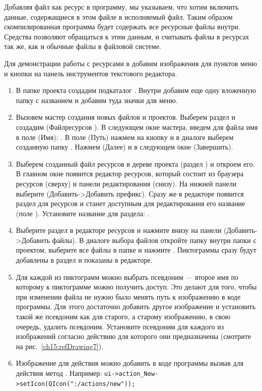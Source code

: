 Добавляя файл как ресурс в программу, мы указываем, что хотим включить данные, содержащиеся в этом файле
в исполняемый файл. Таким образом скомпилированная программа будет содержать все ресурсные файлы внутри. Средства 
позволяют обращаться к этим данным, и считывать файлы в ресурсах так же, как и обычные файлы в файловой системе. 

Для демонстрации работы с ресурсами в  добавим изображения для пунктов меню и кнопки на панель инструментов текстового
редактора. 

\begin{enumerate}
\item В папке проекта создадим подкаталог . Внутри добавим еще одну вложенную папку с названием
 и добавим туда значки для меню. 
\item Вызовем мастер создания новых файлов и проектов. Выберем раздел  и создадим
 (Файлресурсов ). В следующем окне мастера, 
введем для файла имя в поле  (Имя): . В поле  (Путь) нажмем на 
кнопку и в диалоге выберем созданную папку . Нажмем  (Далее) и в 
следующем окне  (Завершить). 
\item Выберем созданный файл ресурсов в дереве проекта (раздел ) и откроем его. В главном
окне  появится редактор ресурсов, который состоит из браузера ресурсов (сверху) и панели редактирования
(снизу). На нижней панели выберите  (Добавить->Добавить префикс). Сразу же
в редакторе появится раздел для ресурсов и станет доступным для редактирования его название (поле
). Установите название для раздела: . 
\item Выберите раздел  в редакторе ресурсов и нажмите внизу на панели 
 (Добавить->Добавить файлы). В диалоге выбора файлов откройте папку  внутри папки с
проектом, выберите все файлы в папке и нажмите . Пиктограммы сразу будут добавлены в раздел и
показаны в редакторе. 
\item Для каждой из пиктограмм можно выбрать псевдоним --- второе имя по которому к пиктограмме 
можно получить доступ. Это
делают для того, чтобы при изменении файла не нужно было менять путь к изображению в коде программы. 
Для этого
достаточно добавить другое изображение и установить такой же псевдоним как для старого, а старому 
изображению, в свою
очередь, удалить псевдоним. Установите псевдоним для каждого из изображений согласно действию для которого они
предназначены (смотрите на рис.~\ref{ch15:refDrawing7}).
\item Изображение для действия можно добавить в коде программы вызвав для действия метод
. Например: \lstinline!ui->action_New->setIcon(QIcon(":/actions/new"));! 


\end{enumerate}
